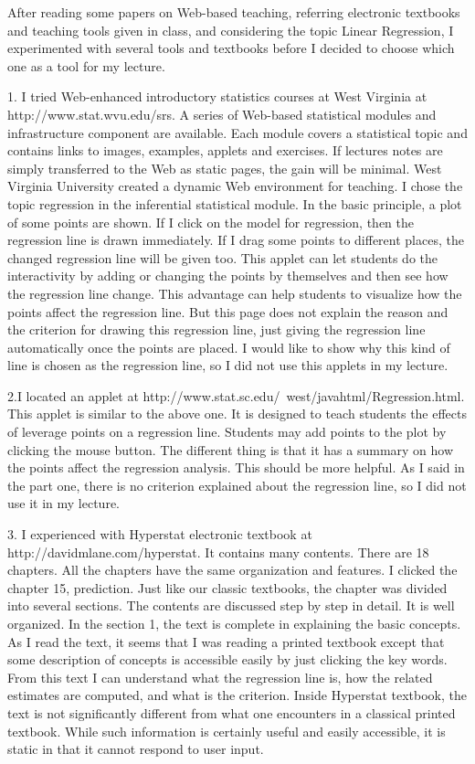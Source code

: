 After reading some papers on Web-based teaching, referring electronic 
textbooks and teaching tools given in class, and considering the topic Linear 
Regression, I experimented with several tools and textbooks before I decided 
to choose which one as a tool for my lecture.

1. I tried Web-enhanced introductory statistics courses at West Virginia at 
http://www.stat.wvu.edu/srs. A series of Web-based statistical modules and 
infrastructure component are available. Each module covers a statistical topic 
and contains links to images, examples, applets and exercises. If lectures 
notes are simply transferred to the Web as static pages, the gain will be 
minimal. West Virginia University created a dynamic Web environment for 
teaching. I chose the topic regression in the inferential statistical module. 
In the basic principle, a plot of some points are shown. If I click on the 
model
for regression, then the regression line is drawn immediately. If I drag some 
points to different places, the changed regression line will be given too. 
This applet can let students do the interactivity by adding or changing the 
points by themselves and then see how the regression line change. This 
advantage can help students to visualize how the points affect the regression 
line. But this page does not explain the reason and the criterion for drawing 
this regression line, just giving the regression line automatically once the 
points are placed. I would like to show why this kind of line is chosen as the 
regression line, so I did not use this applets in my lecture.


2.I located an applet at 
http://www.stat.sc.edu/~west/javahtml/Regression.html. This applet is similar 
to the above one. It is designed to teach students the effects of leverage 
points on a regression line. Students may add points to the plot by clicking 
the mouse button. The different thing is that it has a summary on how the 
points affect the regression analysis. This should be more helpful. As I said 
in the part one, there is no criterion explained about the regression line, so 
I did not use it in my lecture.


3. I experienced with Hyperstat electronic textbook at 
http://davidmlane.com/hyperstat.  It contains many contents. There are 18 
chapters. All the chapters have the same organization and features. I clicked 
the chapter 15, prediction. Just like our classic textbooks, the chapter was 
divided into several sections. The contents are discussed step by step in 
detail. It is well organized. In the section 1, the text is complete in 
explaining the basic concepts. As I read the text, it seems that I was reading 
a printed textbook except that some description of concepts is accessible 
easily by just clicking the key words. From this text I can understand what 
the regression line is, how the related estimates are computed, and what is 
the criterion. Inside Hyperstat textbook, the text is not significantly 
different from what one encounters in a classical printed textbook. While such 
information is certainly useful and easily accessible, it is static in that it 
cannot respond to user input.

